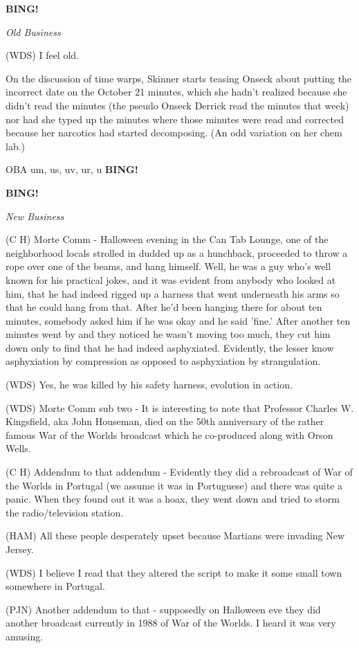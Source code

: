\documentclass[12pt]{article}
\newcommand{\bing}{{\bf BING!} }
\newcommand{\goto}[1]{\bing \vskip 12pt \centerline{{\em{#1}}}}
\begin{document}
\goto{Old Business}

(WDS) I feel old.

On the discussion of time warps, Skinner starts teasing Onseck about putting the incorrect date on the October 21 minutes, which she hadn't realized because she didn't read the minutes (the pseudo Onseck Derrick read the minutes that week) nor had she typed up the minutes where those minutes were read and corrected because her narcotics had started decomposing. (An odd variation on her chem lab.)

OBA um, us, uv, ur, u \bing

\goto{New Business}

(C H) Morte Comm - Halloween evening in the Can Tab Lounge, one of the neighborhood locals strolled in dudded up as a hunchback, proceeded to throw a rope over one of the beams, and hang himself. Well, he was a guy who's well known for his practical jokes, and it was evident from anybody who looked at him, that he had indeed rigged up a harness that went underneath his arms so that he could hang from that. After he'd been hanging there for about ten minutes, somebody asked him if he was okay and he said 'fine.' After another ten minutes went by and they noticed he wasn't moving too much, they cut him down only to find that he had indeed asphyxiated.  Evidently, the lesser know asphyxiation by compression as opposed to asphyxiation by strangulation.

(WDS) Yes, he was killed by his safety harness, evolution in action.

(WDS) Morte Comm sub two - It is interesting to note that Professor Charles W. Kingsfield, aka John Houseman, died on the 50th anniversary of the rather famous War of the Worlds broadcast which he co-produced along with Orson Wells.

(C H) Addendum to that addendum - Evidently they did a rebroadcast of War of the Worlds in Portugal (we assume it was in Portuguese) and there was quite a panic.  When they found out it was a hoax, they went down and tried to storm the radio/television station.

(HAM) All these people desperately upset because Martians were invading New Jersey.

(WDS) I believe I read that they altered the script to make it some small town somewhere in Portugal.

(PJN) Another addendum to that - supposedly on Halloween eve they did another broadcast currently in 1988 of War of the Worlds. I heard it was very amusing.
\end{document}
